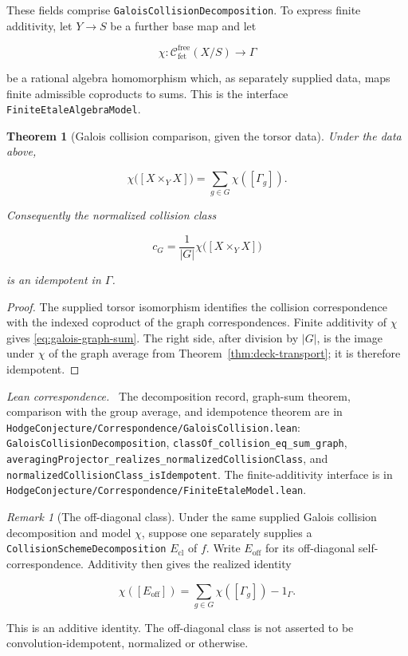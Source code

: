 \documentclass[11pt]{article}
\newtheorem{theorem}{Theorem}[section]
\theoremstyle{definition}
\theoremstyle{remark}
\newtheorem*{remark}{Remark}
\newcommand{\fe}{\mathrm{f\acute et}}
\newcommand{\leanpath}[1]{\texttt{\nolinkurl{#1}}}
\newcommand{\corrsrc}[1]{%
  \leanpath{HodgeConjecture/Correspondence/#1}}
\newenvironment{leanfiles}
  {\par\medskip\begingroup\footnotesize\raggedright\noindent
   \textit{Lean correspondence.}\ }
  {\par\endgroup\medskip}
\begin{document}
These fields comprise \leanpath{GaloisCollisionDecomposition}.  To express
finite additivity, let \(Y\to S\) be a further base map and let

\[
  \chi:\mathcal C_{\fe}^{\mathrm{free}}(X/S)\longrightarrow\Gamma
\]

be a rational algebra homomorphism which, as separately supplied data, maps
finite admissible coproducts to sums.  This is the interface
\leanpath{FiniteEtaleAlgebraModel}.

\begin{theorem}[Galois collision comparison, given the torsor data]
\label{thm:galois-collision}
Under the data above,

\begin{equation}
\label{eq:galois-graph-sum}
  \chi\bigl([X\times_YX]\bigr)
  =\sum_{g\in G}\chi([\Gamma_g]).
\end{equation}

Consequently the normalized collision class

\[
  c_G=\frac{1}{|G|}\chi\bigl([X\times_YX]\bigr)
\]

is an idempotent in \(\Gamma\).
\end{theorem}

\begin{proof}
The supplied torsor isomorphism identifies the collision correspondence with
the indexed coproduct of the graph correspondences.  Finite additivity of
\(\chi\) gives \eqref{eq:galois-graph-sum}.  The right side, after division
by \(|G|\), is the image under \(\chi\) of the graph average from
Theorem~\ref{thm:deck-transport}; it is therefore idempotent.
\end{proof}

\begin{leanfiles}
The decomposition record, graph-sum theorem, comparison with the group
average, and idempotence theorem are in \corrsrc{GaloisCollision.lean}:
\leanpath{GaloisCollisionDecomposition},
\leanpath{classOf_collision_eq_sum_graph},
\leanpath{averagingProjector_realizes_normalizedCollisionClass}, and
\leanpath{normalizedCollisionClass_isIdempotent}.  The finite-additivity
interface is in \corrsrc{FiniteEtaleModel.lean}.
\end{leanfiles}

\begin{remark}[The off-diagonal class]
Under the same supplied Galois collision decomposition and model \(\chi\),
suppose one separately supplies a
\leanpath{CollisionSchemeDecomposition} \(E_{\mathrm{cl}}\) of \(f\).  Write
\(E_{\mathrm{off}}\) for its off-diagonal self-correspondence.  Additivity
then gives the realized identity

\[
  \chi([E_{\mathrm{off}}])
  =\sum_{g\in G}\chi([\Gamma_g])-1_{\Gamma}.
\]

This is an additive identity.  The off-diagonal class is not asserted to be
convolution-idempotent, normalized or otherwise.
\end{remark}
\end{document}
